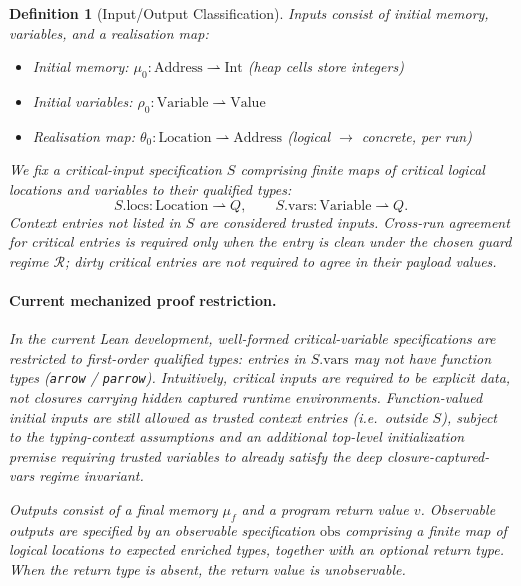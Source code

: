 \documentclass[12pt]{article}
\newtheorem{definition}{Definition}[section]
\begin{document}
\begin{definition}[Input/Output Classification]
Inputs consist of initial memory, variables, and a realisation map:
\begin{itemize}
    \item Initial memory: $\mu_0 : \text{Address} \rightharpoonup \text{Int}$ (heap cells store integers)
    \item Initial variables: $\rho_0 : \text{Variable} \rightharpoonup \text{Value}$
    \item Realisation map: $\theta_0 : \text{Location} \rightharpoonup \text{Address}$ (logical $\to$ concrete, per run)
\end{itemize}
We fix a \emph{critical-input specification} $S$ comprising finite maps of critical \emph{logical} locations and variables to their qualified types:
\[
  S.\mathrm{locs} : \text{Location} \rightharpoonup Q,\qquad
  S.\mathrm{vars} : \text{Variable} \rightharpoonup Q.
\]
Context entries not listed in $S$ are considered \emph{trusted inputs}.
Cross-run agreement for critical entries is required only when the entry is
clean under the chosen guard regime $\mathcal{R}$; dirty critical entries are
not required to agree in their payload values.

\paragraph{Current mechanized proof restriction.}
In the current Lean development, well-formed critical-variable specifications are
restricted to \emph{first-order} qualified types: entries in $S.\mathrm{vars}$ may
not have function types (\texttt{arrow} / \texttt{parrow}). Intuitively, critical
inputs are required to be explicit data, not closures carrying hidden captured
runtime environments. Function-valued initial inputs are still allowed as trusted
context entries (i.e.\ outside $S$), subject to the typing-context assumptions and
an additional top-level initialization premise requiring trusted variables to
already satisfy the deep closure-captured-vars regime invariant.

Outputs consist of a final memory $\mu_f$ and a program return value $v$. Observable outputs are specified by an \emph{observable specification} $\text{obs}$ comprising a finite map of logical locations to expected enriched types, together with an optional return type. When the return type is absent, the return value is unobservable.
\end{definition}
\end{document}
